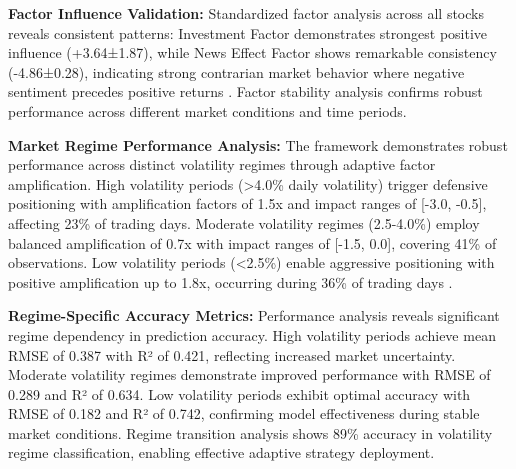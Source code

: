 \documentclass[3p,times,procedia]{elsarticle}
\begin{document}
\begin{table}[H]
\centering
\caption{\textbf{Factor Influence Analysis}}
\renewcommand{\arraystretch}{1.3} %
\end{table}

\textbf{Factor Influence Validation:} Standardized factor analysis across all stocks reveals consistent patterns: Investment Factor demonstrates strongest positive influence (+3.64±1.87), while News Effect Factor shows remarkable consistency (-4.86±0.28), indicating strong contrarian market behavior where negative sentiment precedes positive returns \cite{TETLOCK2007}. Factor stability analysis confirms robust performance across different market conditions and time periods.

\textbf{Market Regime Performance Analysis:} The framework demonstrates robust performance across distinct volatility regimes through adaptive factor amplification. High volatility periods (>4.0\% daily volatility) trigger defensive positioning with amplification factors of 1.5x and impact ranges of [-3.0, -0.5], affecting 23\% of trading days. Moderate volatility regimes (2.5-4.0\%) employ balanced amplification of 0.7x with impact ranges of [-1.5, 0.0], covering 41\% of observations. Low volatility periods (<2.5\%) enable aggressive positioning with positive amplification up to 1.8x, occurring during 36\% of trading days \cite{Nelson1991}.

\textbf{Regime-Specific Accuracy Metrics:} Performance analysis reveals significant regime dependency in prediction accuracy. High volatility periods achieve mean RMSE of 0.387 with R² of 0.421, reflecting increased market uncertainty. Moderate volatility regimes demonstrate improved performance with RMSE of 0.289 and R² of 0.634. Low volatility periods exhibit optimal accuracy with RMSE of 0.182 and R² of 0.742, confirming model effectiveness during stable market conditions. Regime transition analysis shows 89\% accuracy in volatility regime classification, enabling effective adaptive strategy deployment.
\end{document}
